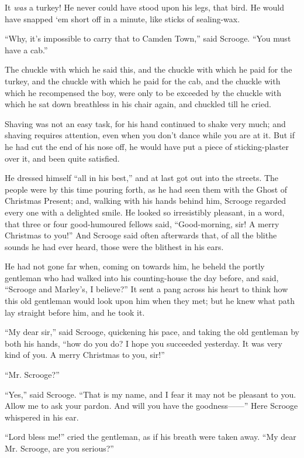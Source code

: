\documentclass[paper=5.5in:8.5in,BCOR=15mm,twoside,DIV=15,headinclude=off,12pt,chapterprefix=off,openany,headings=huge]{scrbook} %
\begin{document}
It \textit{was} a turkey! He never could have stood upon his legs, that bird. He would have snapped `em short off in a minute, like sticks of sealing-wax.

\enquote{Why, it's impossible to carry that to Camden Town,} said Scrooge. \enquote{You must have a cab.}

The chuckle with which he said this, and the chuckle with which he paid for the turkey, and the chuckle with which he paid for the cab, and the chuckle with which he recompensed the boy, were only to be exceeded by the chuckle with which he sat down breathless in his chair again, and chuckled till he cried.

Shaving was not an easy task, for his hand continued to shake very much; and shaving requires attention, even when you don't dance while you are at it. But if he had cut the end of his nose off, he would have put a piece of sticking-plaster over it, and been quite satisfied.

He dressed himself \enquote{all in his best,} and at last got out into the streets. The people were by this time pouring forth, as he had seen them with the Ghost of Christmas Present; and, walking with his hands behind him, Scrooge regarded every one with a delighted smile. He looked so irresistibly pleasant, in a word, that three or four good-humoured fellows said, \enquote{Good-morning, sir! A merry Christmas to you!} And Scrooge said often afterwards that, of all the blithe sounds he had ever heard, those were the blithest in his ears.

He had not gone far when, coming on towards him, he beheld the portly gentleman who had walked into his counting-house the day before, and said, \enquote{Scrooge and Marley's, I believe?} It sent a pang across his heart to think how this old gentleman would look upon him when they met; but he knew what path lay straight before him, and he took it.

\enquote{My dear sir,} said Scrooge, quickening his pace, and taking the old gentleman by both his hands, \enquote{how do you do? I hope you succeeded yesterday. It was very kind of you. A merry Christmas to you, sir!}

\enquote{Mr. Scrooge?}

\enquote{Yes,} said Scrooge. \enquote{That is my name, and I fear it may not be pleasant to you. Allow me to ask your pardon. And will you have the goodness——} Here Scrooge whispered in his ear.

\enquote{Lord bless me!} cried the gentleman, as if his breath were taken away. \enquote{My dear Mr. Scrooge, are you serious?}
\end{document}
